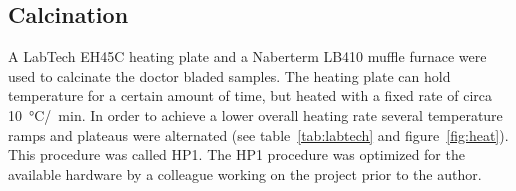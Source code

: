 \documentclass[a4paper]{article}
\newcommand{\td}[1]{\textcolor{red}{#1}}
\newcommand{\minutes}[1]{\SI{#1}{\minute}}
\newcommand{\oc}[1]{\SI{#1}{\degreeCelsius}}
\begin{document}
\subsection{Calcination}
A LabTech EH45C heating plate and a Naberterm LB410 muffle furnace were used to calcinate the doctor bladed samples. 
The heating plate can hold temperature for a certain amount of time, but heated with a fixed rate of circa \oc{10}/\minutes{}.
In order to achieve a lower overall heating rate several temperature ramps and plateaus were alternated (see table~\ref{tab:labtech} and figure~\ref{fig:heat}).
This procedure was called HP1.
The HP1 procedure was optimized for the available hardware by a colleague working on the project prior to the author.
\end{document}
